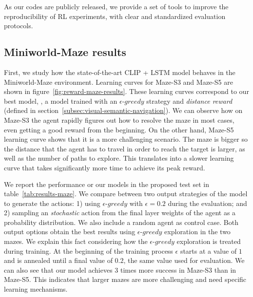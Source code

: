 As our codes are publicly released, we provide a set of tools to improve the reproducibility of RL experiments, with clear and standardized evaluation protocols.

\subsection{Miniworld-Maze results}\label{subsec:miniworld-maze-results}

First, we study how the state-of-the-art CLIP + LSTM model behaves in the Miniworld-Maze environment.
Learning curves for Maze-S3 and Maze-S5 are shown in figure~\ref{fig:reward-maze-results}.
These learning curves correspond to our best model, \ie, a model trained with an $\epsilon\text{-}greedy$ strategy and \textit{distance reward} (defined in section~\ref{subsec:visual-semantic-navigation}).
We can observe how on Maze-S3 the agent rapidly figures out how to resolve the maze in most cases, even getting a good reward from the beginning.
On the other hand, Maze-S5 learning curve shows that it is a more challenging scenario.
The maze is bigger so the distance that the agent has to travel in order to reach the target is larger, as well as the number of paths to explore.
This translates into a slower learning curve that takes significantly more time to achieve its peak reward.


We report the performance or our models in the proposed test set in table~\ref{tab:results-maze}.
We compare between two output strategies of the model to generate the actions:
1) using $\epsilon\text{-}greedy$ with $\epsilon=0.2$ during the evaluation;
and 2) sampling an \textit{stochastic} action from the final layer weights of the agent as a probability distribution.
We also include a random agent as control case.
Both output options obtain the best results using $\epsilon\text{-}greedy$ exploration in the two mazes.
We explain this fact considering how the $\epsilon\text{-}greedy$ exploration is treated during training.
At the beginning of the training process $\epsilon$ starts at a value of $1$ and is annealed until a final value of $0.2$, the same value used for evaluation.
We can also see that our model achieves 3 times more success in Maze-S3 than in Maze-S5.
This indicates that larger mazes are more challenging and need specific learning mechanisms.

